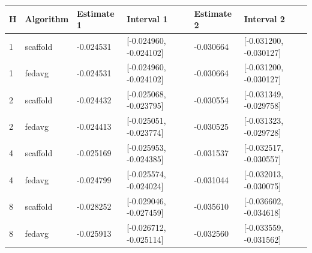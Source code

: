 \begin{tabular}{llllll}
H & Algorithm & Estimate 1 & Interval 1 & Estimate 2 & Interval 2 \\
\hline
1 & scaffold & -0.024531 & [-0.024960, -0.024102] & -0.030664 & [-0.031200, -0.030127] \\
1 & fedavg & -0.024531 & [-0.024960, -0.024102] & -0.030664 & [-0.031200, -0.030127] \\
2 & scaffold & -0.024432 & [-0.025068, -0.023795] & -0.030554 & [-0.031349, -0.029758] \\
2 & fedavg & -0.024413 & [-0.025051, -0.023774] & -0.030525 & [-0.031323, -0.029728] \\
4 & scaffold & -0.025169 & [-0.025953, -0.024385] & -0.031537 & [-0.032517, -0.030557] \\
4 & fedavg & -0.024799 & [-0.025574, -0.024024] & -0.031044 & [-0.032013, -0.030075] \\
8 & scaffold & -0.028252 & [-0.029046, -0.027459] & -0.035610 & [-0.036602, -0.034618] \\
8 & fedavg & -0.025913 & [-0.026712, -0.025114] & -0.032560 & [-0.033559, -0.031562] \\
\end{tabular}
